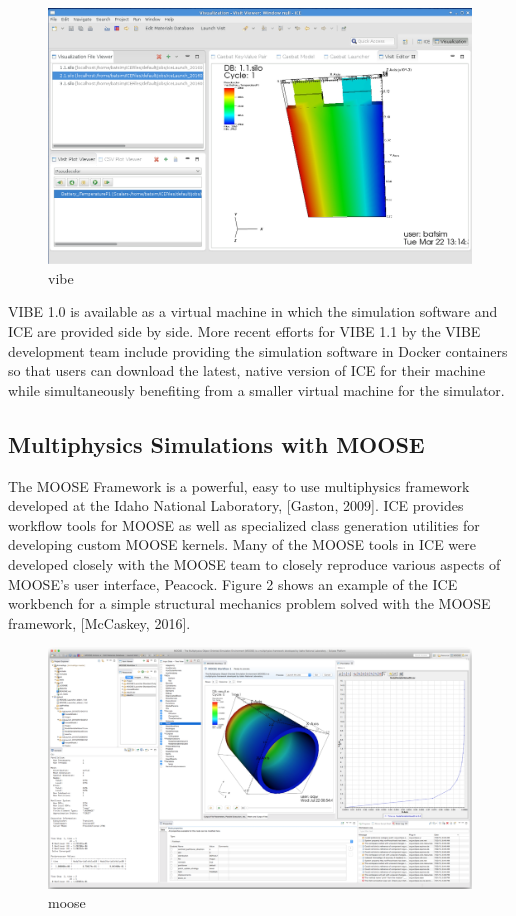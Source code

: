 \begin{figure}[htbp]
\centering
\includegraphics[width=\textwidth]{images/vibe_20151016.png}
\caption{vibe}
\end{figure}

VIBE 1.0 is available as a virtual machine in which the simulation
software and ICE are provided side by side. More recent efforts for VIBE
1.1 by the VIBE development team include providing the simulation
software in Docker containers so that users can download the latest,
native version of ICE for their machine while simultaneously benefiting
from a smaller virtual machine for the simulator.

\subsection{Multiphysics Simulations with
MOOSE}\label{multiphysics-simulations-with-moose}

The MOOSE Framework is a powerful, easy to use multiphysics framework
developed at the Idaho National Laboratory, {[}Gaston, 2009{]}. ICE
provides workflow tools for MOOSE as well as specialized class
generation utilities for developing custom MOOSE kernels. Many of the
MOOSE tools in ICE were developed closely with the MOOSE team to closely
reproduce various aspects of MOOSE's user interface, Peacock. Figure 2
shows an example of the ICE workbench for a simple structural mechanics
problem solved with the MOOSE framework, {[}McCaskey, 2016{]}.

\begin{figure}[htbp]
\centering
\includegraphics[width=\textwidth]{images/ice-moose.png}
\caption{moose}
\end{figure}

